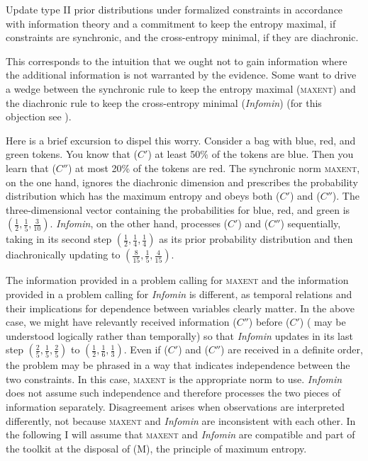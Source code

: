 \begin{quotex}
  Update type II prior distributions under formalized constraints in
  accordance with information theory and a commitment to keep the
  entropy maximal, if constraints are synchronic, and the
  cross-entropy minimal, if they are diachronic.
\end{quotex}

This corresponds to the intuition that we ought not to gain
information where the additional information is not warranted by the
evidence. Some want to drive a wedge between the synchronic rule to
keep the entropy maximal (\textsc{maxent}) and the diachronic rule to
keep the cross-entropy minimal (\emph{Infomin}) (for this objection
see ).

Here is a brief excursion to dispel this worry. Consider a bag with
blue, red, and green tokens. You know that ($C'$) at least 50\% of the
tokens are blue. Then you learn that ($C''$) at most 20\% of the tokens
are red. The synchronic norm \textsc{maxent}, on the one hand, ignores
the diachronic dimension and prescribes the probability distribution
which has the maximum entropy and obeys both ($C'$) and ($C''$). The
three-dimensional vector containing the probabilities for blue, red,
and green is $(\frac{1}{2},\frac{1}{5},\frac{3}{10})$. \emph{Infomin},
on the other hand, processes ($C'$) and ($C''$) sequentially, taking in its
second step $(\frac{1}{2},\frac{1}{4},\frac{1}{4})$ as its prior
probability distribution and then diachronically updating to
$(\frac{8}{15},\frac{1}{5},\frac{4}{15})$.

The information provided in a problem calling for \textsc{maxent} and
the information provided in a problem calling for \emph{Infomin} is
different, as temporal relations and their implications for dependence
between variables clearly matter. In the above case, we might have
relevantly received information ($C''$) before ($C'$) ( may
be understood logically rather than temporally) so that \emph{Infomin}
updates in its last step $(\frac{2}{5},\frac{1}{5},\frac{2}{5})$ to
$(\frac{1}{2},\frac{1}{6},\frac{1}{3})$. Even if ($C'$) and ($C''$) are
received in a definite order, the problem may be phrased in a way that
indicates independence between the two constraints. In this case,
\textsc{maxent} is the appropriate norm to use. \emph{Infomin} does
not assume such independence and therefore processes the two pieces of
information separately. Disagreement arises when observations are
interpreted differently, not because \textsc{maxent} and
\emph{Infomin} are inconsistent with each other. In the following I
will assume that \textsc{maxent} and \emph{Infomin} are compatible and
part of the toolkit at the disposal of (M), the principle of maximum
entropy.

